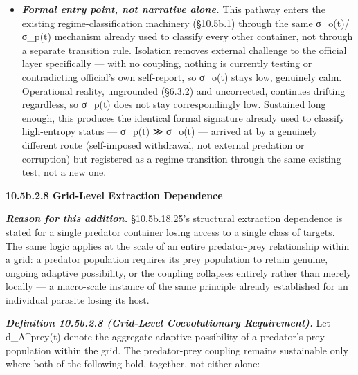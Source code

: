 \documentclass[
]{article}
\begin{document}
\begin{itemize}
\item
  \emph{\textbf{Formal entry point, not narrative alone.}} This pathway
  enters the existing regime-classification machinery (§10.5b.1) through
  the same σ\_o(t)/σ\_p(t) mechanism already used to classify every
  other container, not through a separate transition rule. Isolation
  removes external challenge to the official layer specifically --- with
  no coupling, nothing is currently testing or contradicting official's
  own self-report, so σ\_o(t) stays low, genuinely calm. Operational
  reality, ungrounded (§6.3.2) and uncorrected, continues drifting
  regardless, so σ\_p(t) does not stay correspondingly low. Sustained
  long enough, this produces the identical formal signature already used
  to classify high-entropy status --- σ\_p(t) ≫ σ\_o(t) --- arrived at
  by a genuinely different route (self-imposed withdrawal, not external
  predation or corruption) but registered as a regime transition through
  the same existing test, not a new one.
\end{itemize}

\textbf{10.5b.2.8 Grid-Level Extraction Dependence}

\emph{\textbf{Reason for this addition.}} §10.5b.18.25's structural
extraction dependence is stated for a single predator container losing
access to a single class of targets. The same logic applies at the scale
of an entire predator-prey relationship within a grid: a predator
population requires its prey population to retain genuine, ongoing
adaptive possibility, or the coupling collapses entirely rather than
merely locally --- a macro-scale instance of the same principle already
established for an individual parasite losing its host.

\emph{\textbf{Definition 10.5b.2.8 (Grid-Level Coevolutionary
Requirement).}} Let d\_A\^{}prey(t) denote the aggregate adaptive
possibility of a predator's prey population within the grid. The
predator-prey coupling remains sustainable only where both of the
following hold, together, not either alone:
\end{document}
